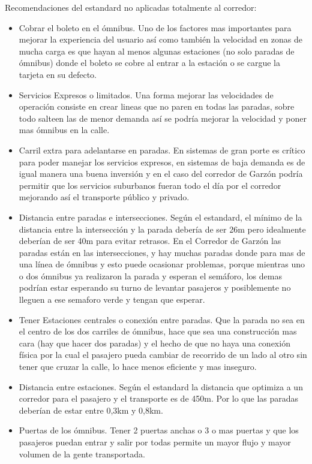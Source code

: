 Recomendaciones del estandard no aplicadas totalmente al corredor:
\begin{itemize}
	\item Cobrar el boleto en el ómnibus. Uno de los factores mas importantes para mejorar la experiencia del usuario así como también la velocidad en zonas de mucha carga es que hayan al menos algunas estaciones (no solo paradas de ómnibus) donde el boleto se cobre al entrar a la estación o se cargue la tarjeta en su defecto.
	\item Servicios Expresos o limitados. Una forma mejorar las velocidades de operación consiste en crear lineas que no paren en todas las paradas, sobre todo salteen las de menor demanda así se podría mejorar la velocidad y poner mas ómnibus en la calle.
	\item Carril extra para adelantarse en paradas. En sistemas de gran porte es crítico para poder manejar los servicios expresos, en sistemas de baja demanda es de igual manera una buena inversión y en el caso del corredor de Garzón podría permitir que los servicios suburbanos fueran todo el día por el corredor mejorando así el transporte público y privado.
	\item Distancia entre paradas e intersecciones. Según el estandard, el mínimo de la distancia entre la intersección y la parada debería de ser 26m pero idealmente deberían de ser 40m para evitar retrasos. En el Corredor de Garzón las paradas están en las intersecciones, y hay muchas paradas donde para mas de una línea de ómnibus y esto puede ocasionar problemas, porque mientras uno o dos ómnibus ya realizaron la parada y esperan el semáforo, los demas podrían estar esperando su turno de levantar pasajeros y posiblemente no lleguen a ese semaforo verde y tengan que esperar.
	\item Tener Estaciones centrales o conexión entre paradas. Que la parada no sea en el centro de los dos carriles de ómnibus, hace que sea una construcción mas cara (hay que hacer dos paradas) y el hecho de que no haya una conexión física por la cual el pasajero pueda cambiar de recorrido de un lado al otro sin tener que cruzar la calle, lo hace menos eficiente y mas inseguro.
	\item Distancia entre estaciones. Según el estandard la distancia que optimiza a un corredor para el pasajero y el transporte es de 450m. Por lo que las paradas deberían de estar entre 0,3km y 0,8km.
	\item Puertas de los ómnibus. Tener 2 puertas anchas o 3 o mas puertas y que los pasajeros puedan entrar y salir por todas permite un mayor flujo y mayor volumen de la gente transportada.

\end{itemize}
